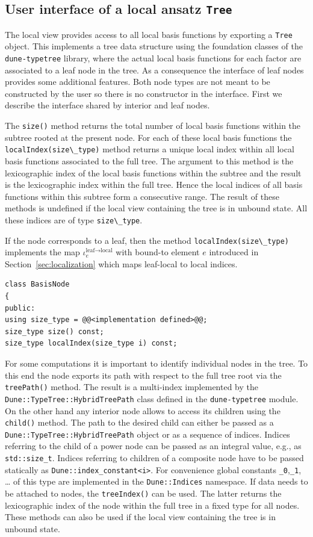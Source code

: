 \documentclass[a4paper,10pt,headings=normal,bibliography=totoc]{scrartcl}
\newcommand{\cpp}[1]{\lstinline[basicstyle=\ttfamily]!#1!}
\newcommand{\dunemodule}[1]{\texttt{#1}}
\begin{document}
\subsection{User interface of a local ansatz \texorpdfstring{\cpp{Tree}}{Tree}}
The local view provides access to all local basis functions
by exporting a \cpp{Tree} object. This implements a tree
data structure using the foundation classes of the
\dunemodule{dune-typetree} library, where the actual local basis
functions for each factor are associated to a leaf node
in the tree. As a consequence the interface of leaf nodes
provides some additional features.
Both node types are not meant to be constructed by the
user so there is no constructor in the interface.
First we describe the interface shared by interior
and leaf nodes.

The \cpp{size()} method returns the total number of
local basis functions within the subtree rooted at the
present node. For each of these local basis functions
the \cpp{localIndex(size\_type)} method returns a unique
local index within all local basis functions associated to the full
tree.
The argument to this method is the lexicographic
index of the local basis functions within the subtree
and the result is the lexicographic index within the full
tree.
Hence the local indices of all basis functions
within this subtree form a consecutive range.
The result of these methods is undefined if the
local view containing the tree is in unbound state.
All these indices are of type \cpp{size\_type}.

If the node corresponds to a leaf,
then the method \cpp{localIndex(size\_type)}
implements the map $\iota^{\text{leaf}\to\text{local}}_e$
with bound-to element $e$
introduced in Section~\ref{sec:localization}
which maps leaf-local to local indices.

\begin{lstlisting}[style=Interface]
class BasisNode
{
public:
using size_type = @@<implementation defined>@@;
size_type size() const;
size_type localIndex(size_type i) const;
\end{lstlisting}

For some computations it is important to identify
individual nodes in the tree. To this end the node
exports its path with respect to the full tree root
via the \cpp{treePath()} method.
The result is a multi-index
implemented by the \cpp{Dune::TypeTree::HybridTreePath}
class defined in the \dunemodule{dune-typetree} module.
On the other hand any interior node allows to access
its children using the \cpp{child()} method.
The path to the desired child can either be passed
as a \cpp{Dune::TypeTree::HybridTreePath} object
or as a sequence of indices. Indices referring
to the child of a power node can be passed as
an integral value, e.g., as \cpp{std::size_t}.
Indices referring to children of a composite node
have to be passed statically as \cpp{Dune::index_constant<i>}.
For convenience global constants \cpp{_0},\cpp{_1}, \dots
of this type are implemented in the \cpp{Dune::Indices}
namespace.
If data needs to be attached to nodes,
the \cpp{treeIndex()} can be used. The latter returns
the lexicographic index of the node within the full
tree in a fixed type for all nodes.
These methods can also be used if the local view containing
the tree is in unbound state.
\end{document}
